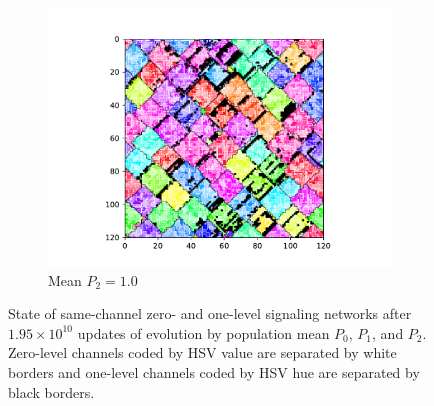 \begin{figure}[t]
\begin{center}
\begin{subfigure}[b]{0.82\columnwidth}
  \includegraphics[width=\columnwidth,trim={2.5cm 0.5cm 2.5cm 1cm},clip]{img/ChannelMap_1008_update19500000}
  \caption{Mean $P_2 = 1.0$}
  \label{fig:ChannelMap_1008}
\end{subfigure}

\caption{
State of same-channel zero- and one-level signaling networks after $1.95 \times 10^{10}$ updates of evolution by population mean $P_0$, $P_1$, and $P_2$.
Zero-level channels coded by HSV value are separated by white borders and one-level channels coded by HSV hue are separated by black borders.
}
\label{fig:outcome_grids}
\end{center}
\end{figure}
